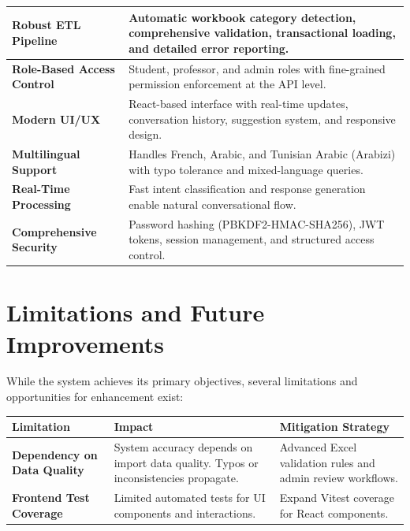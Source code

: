 \begin{fig}[H]
\begin{center}
\begin{tabular}{|p{3.5cm}|p{10cm}|}
\textbf{Robust ETL Pipeline} & 
Automatic workbook category detection, comprehensive validation, transactional loading, and detailed error reporting. \\
\hline

\textbf{Role-Based Access Control} & 
Student, professor, and admin roles with fine-grained permission enforcement at the API level. \\
\hline

\textbf{Modern UI/UX} & 
React-based interface with real-time updates, conversation history, suggestion system, and responsive design. \\
\hline

\textbf{Multilingual Support} & 
Handles French, Arabic, and Tunisian Arabic (Arabizi) with typo tolerance and mixed-language queries. \\
\hline

\textbf{Real-Time Processing} & 
Fast intent classification and response generation enable natural conversational flow. \\
\hline

\textbf{Comprehensive Security} & 
Password hashing (PBKDF2-HMAC-SHA256), JWT tokens, session management, and structured access control. \\
\hline

\end{tabular}
\end{center}

\section{Limitations and Future Improvements}

While the system achieves its primary objectives, several limitations and opportunities for enhancement exist:

\begin{center}
\begin{tabular}{|p{3.5cm}|p{5.5cm}|p{4cm}|}
\hline
\textbf{Limitation} & \textbf{Impact} & \textbf{Mitigation Strategy} \\
\hline

\textbf{Dependency on Data Quality} & 
System accuracy depends on import data quality. Typos or inconsistencies propagate. & 
Advanced Excel validation rules and admin review workflows. \\
\hline

\textbf{Frontend Test Coverage} & 
Limited automated tests for UI components and interactions. & 
Expand Vitest coverage for React components. \\
\hline


\end{tabular}
\end{center}
\end{fig}
